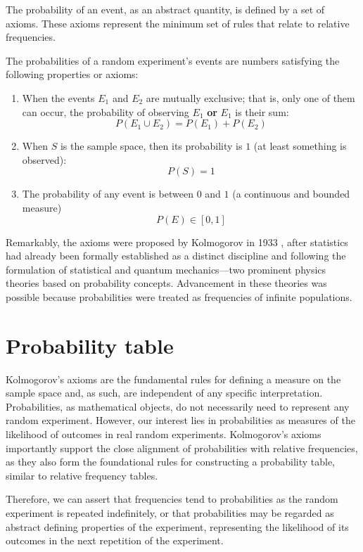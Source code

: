 \documentclass[
]{book}
\begin{document}
The probability of an event, as an abstract quantity, is defined by a set of axioms. These axioms represent the minimum set of rules that relate to relative frequencies.

The probabilities of a random experiment's events are numbers satisfying the following properties or axioms:

\begin{enumerate}
\def\labelenumi{\arabic{enumi})}
\item
  When the events \(E_1\) and \(E_2\) are mutually exclusive; that is, only one of them can occur, the probability of observing \(E_1\) \textbf{or} \(E_1\) is their sum:
  \[ P( E_1\cup E_2) = P(E_1) + P(E_2)\]
\item
  When \(S\) is the sample space, then its probability is \(1\) (at least something is observed): \[P(S)=1\]
\item
  The probability of any event is between \(0\) and \(1\) (a continuous and bounded measure) \[P(E) \in [0,1]\]
\end{enumerate}

Remarkably, the axioms were proposed by Kolmogorov in 1933 \citep{kolmogorov2013foundations}, after statistics had already been formally established as a distinct discipline and following the formulation of statistical and quantum mechanics---two prominent physics theories based on probability concepts. Advancement in these theories was possible because probabilities were treated as frequencies of infinite populations.

\hypertarget{probability-table}{%
\section{Probability table}\label{probability-table}}

Kolmogorov's axioms are the fundamental rules for defining a measure on the sample space and, as such, are independent of any specific interpretation. Probabilities, as mathematical objects, do not necessarily need to represent any random experiment. However, our interest lies in probabilities as measures of the likelihood of outcomes in real random experiments. Kolmogorov's axioms importantly support the close alignment of probabilities with relative frequencies, as they also form the foundational rules for constructing a probability table, similar to relative frequency tables.

Therefore, we can assert that frequencies tend to probabilities as the random experiment is repeated indefinitely, or that probabilities may be regarded as abstract defining properties of the experiment, representing the likelihood of its outcomes in the next repetition of the experiment.
\end{document}
